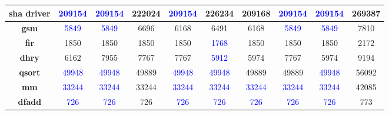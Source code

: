 \begin{table*}[]
\begin{tabular}{|c|c|c|c|c|c|c|c|c|c|}
\textbf{sha driver} & \textcolor{blue}{209154}    & \textcolor{blue}{209154}   & 222024                                & \textcolor{blue}{209154}                          & 226234                             & 209168                             & \textcolor{blue}{209154} & \textcolor{blue}{209154} & 269387                            \\ \hline
\textbf{gsm}        & \textcolor{blue}{5849}      & \textcolor{blue}{5849}     & 6696                                  & 6168                           & 6491                               & 6168                               & \textcolor{blue}{5849}   & \textcolor{blue}{5849}   & 7810                              \\ \hline
\textbf{fir}        & 1850                                   & 1850                                  & 1850                                  & 1850                           & \textcolor{blue}{1768}  & 1850                               & 1850                                & 1850                                & 2172                              \\ \hline
\textbf{dhry}       & 6162                                   & 7955                                  & 7767                                  & 7767                           & \textcolor{blue}{5912}  & 5974                               & 7767                                & 5974                                & 9194                              \\ \hline
\textbf{qsort}      & \textcolor{blue}{49948}     & \textcolor{blue}{49948}    & 49889                                 & \textcolor{blue}{49948}                           & \textcolor{blue}{49948} & 49889                              & 49889                               & \textcolor{blue}{49948}  & 56092                             \\ \hline
\textbf{mm}         & \textcolor{blue}{33244}     & \textcolor{blue}{33244}    & 33244                                 & \textcolor{blue}{33244}                           & \textcolor{blue}{33244} & \textcolor{blue}{33244} & \textcolor{blue}{33244}  & \textcolor{blue}{33244}  & 42085                             \\ \hline
\textbf{dfadd}      & \textcolor{blue}{726}       & \textcolor{blue}{726}      & 726                                   & \textcolor{blue}{726}                           & \textcolor{blue}{726}   & \textcolor{blue}{726}   & \textcolor{blue}{726}    & \textcolor{blue}{726}    & 773                               \\ \hline
\end{tabular}
\end{table*}

